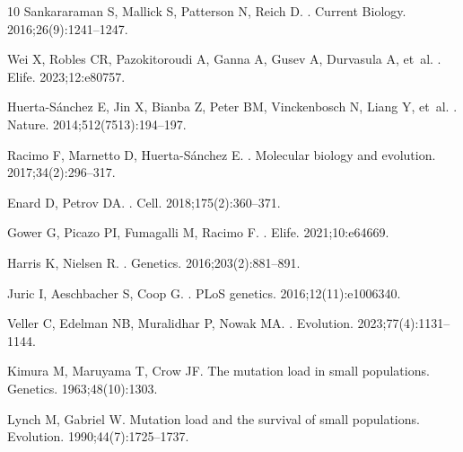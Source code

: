\documentclass[10pt,letterpaper]{article}
\begin{document}
\begin{thebibliography}{10}
Sankararaman S, Mallick S, Patterson N, Reich D.
.
\newblock Current Biology. 2016;26(9):1241--1247.

Wei X, Robles CR, Pazokitoroudi A, Ganna A, Gusev A, Durvasula A, et~al.
.
\newblock Elife. 2023;12:e80757.

Huerta-S{\'a}nchez E, Jin X, Bianba Z, Peter BM, Vinckenbosch N, Liang Y,
  et~al.
.
\newblock Nature. 2014;512(7513):194--197.

Racimo F, Marnetto D, Huerta-S{\'a}nchez E.
.
\newblock Molecular biology and evolution. 2017;34(2):296--317.

Enard D, Petrov DA.
.
\newblock Cell. 2018;175(2):360--371.

Gower G, Picazo PI, Fumagalli M, Racimo F.
.
\newblock Elife. 2021;10:e64669.

Harris K, Nielsen R.
.
\newblock Genetics. 2016;203(2):881--891.

Juric I, Aeschbacher S, Coop G.
.
\newblock PLoS genetics. 2016;12(11):e1006340.

Veller C, Edelman NB, Muralidhar P, Nowak MA.
.
\newblock Evolution. 2023;77(4):1131--1144.

Kimura M, Maruyama T, Crow JF.
\newblock The mutation load in small populations.
\newblock Genetics. 1963;48(10):1303.

Lynch M, Gabriel W.
\newblock Mutation load and the survival of small populations.
\newblock Evolution. 1990;44(7):1725--1737.


\end{thebibliography}
\end{document}
